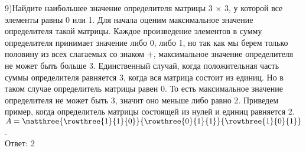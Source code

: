 \documentclass[12pt, a4paper]{article}
\begin{document}
	9)Найдите наибольшее значение определителя матрицы 3 × 3, у которой все элементы равны 0 или 1. \sspace
	Для начала оценим максимальное значение определителя такой матрицы. Каждое произведение элементов в сумму определителя принимает значение либо 0, либо 1, но так как мы берем только половину из всех слагаемых со знаком +, максимальное значение определителя не может быть больше 3. Единственный случай, когда положительная часть суммы определителя равняется 3, когда вся матрица состоит из единиц. Но в таком случае определитель матрицы равен 0. То есть максимальное значение определителя не может быть 3, значит оно меньше либо равно 2. Приведем пример, когда определитель матрицы состоящей из нулей и единиц равняется 2. $A = \matthree{\rowthree{1}{1}{0}}{\rowthree{0}{1}{1}}{\rowthree{1}{0}{1}}$. \\
	Ответ: 2 
	
 
\end{document}
